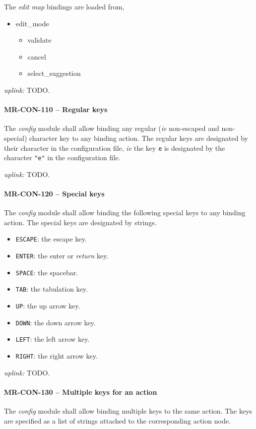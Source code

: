 The \emph{edit map} bindings are loaded from,
\begin{itemize}
\item edit\_mode
  \begin{itemize}
  \item validate
  \item cancel
  \item select\_suggestion
  \end{itemize}
\end{itemize}

\textit{uplink: } TODO.

\paragraph{MR-CON-110 -- Regular keys}
The \emph{config} module shall allow binding any regular (\textit{ie}
non-escaped and non-special) character key to any binding action.
The regular keys are designated by their character in the configuration
file, \textit{ie} the key \lstinline{e} is designated by the character
\lstinline{"e"} in the configuration file.

\textit{uplink: } TODO.

\paragraph{MR-CON-120 -- Special keys}
The \emph{config} module shall allow binding the following special
keys to any binding action. The special keys are designated by strings.
\begin{itemize}
\item \lstinline{ESCAPE}: the escape key.
\item \lstinline{ENTER}: the enter or \emph{return} key.
\item \lstinline{SPACE}: the spacebar.
\item \lstinline{TAB}: the tabulation key.
\item \lstinline{UP}: the up arrow key.
\item \lstinline{DOWN}: the down arrow key.
\item \lstinline{LEFT}: the left arrow key.
\item \lstinline{RIGHT}: the right arrow key.
\end{itemize}

\textit{uplink: } TODO.

\paragraph{MR-CON-130 -- Multiple keys for an action}
The \emph{config} module shall allow binding multiple keys to the
same action. The keys are specified as a list of strings attached
to the corresponding action node.

